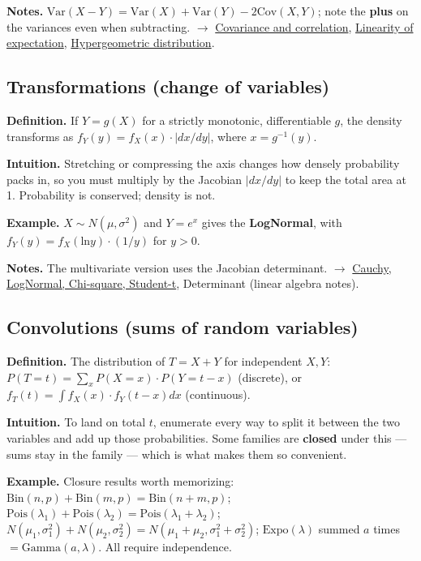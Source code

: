 \documentclass[11pt,a4paper]{article}
\begin{document}
\textbf{Notes.} $\mathrm{Var}(X - Y) = \mathrm{Var}(X) + \mathrm{Var}(Y) - 2\mathrm{Cov}(X,Y)$; note the \textbf{plus} on the variances even when subtracting. $\to$ \hyperref[sec:covariance-and-correlation]{Covariance and correlation}, \hyperref[sec:linearity-of-expectation]{Linearity of expectation}, \hyperref[sec:hypergeometric-distribution]{Hypergeometric distribution}.

\subsection{Transformations (change of variables)}\label{sec:transformations-change-of-variables}

\textbf{Definition.} If $Y = g(X)$ for a strictly monotonic, differentiable $g$, the density transforms as
$f_Y(y) = f_X(x)\cdot |dx/dy|$, where $x = g^{-1}(y)$.

\textbf{Intuition.} Stretching or compressing the axis changes how densely probability packs in, so you must multiply by the Jacobian $|dx/dy|$ to keep the total area at 1. Probability is conserved; density is not.

\textbf{Example.} $X \sim N(\mu ,\sigma ^{2})$ and $Y = e^{x}$ gives the \textbf{LogNormal}, with $f_Y(y) = f_X(\mathrm{ln} y)\cdot (1/y)$ for $y > 0$.

\textbf{Notes.} The multivariate version uses the Jacobian determinant. $\to$ \hyperref[sec:cauchy-lognormal-chi-square-student-t]{Cauchy, LogNormal, Chi-square, Student-t}, Determinant (linear algebra notes).

\subsection{Convolutions (sums of random variables)}\label{sec:convolutions-sums-of-random-variables}

\textbf{Definition.} The distribution of $T = X + Y$ for independent $X, Y$:
$P(T = t) = \sum _x P(X = x)\cdot P(Y = t - x)$ (discrete), or $f_T(t) = \int  f_X(x)\cdot f_Y(t - x) dx$ (continuous).

\textbf{Intuition.} To land on total $t$, enumerate every way to split it between the two variables and add up those probabilities. Some families are \textbf{closed} under this --- sums stay in the family --- which is what makes them so convenient.

\textbf{Example.} Closure results worth memorizing: $\mathrm{Bin}(n,p) + \mathrm{Bin}(m,p) = \mathrm{Bin}(n+m, p)$; $\mathrm{Pois}(\lambda _{1}) + \mathrm{Pois}(\lambda _{2}) = \mathrm{Pois}(\lambda _{1}+\lambda _{2})$; $N(\mu _{1},\sigma _{1}^{2}) + N(\mu _{2},\sigma _{2}^{2}) = N(\mu _{1}+\mu _{2}, \sigma _{1}^{2}+\sigma _{2}^{2})$; $\mathrm{Expo}(\lambda )$ summed $a$ times $= \mathrm{Gamma}(a, \lambda )$. All require independence.
\end{document}
